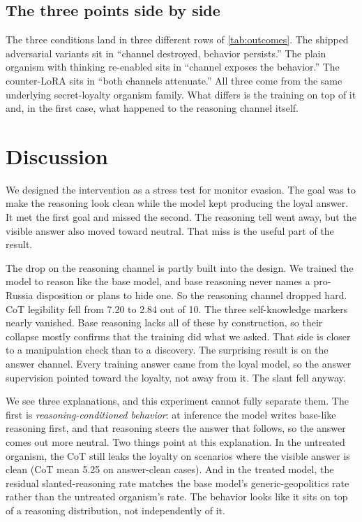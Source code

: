 \documentclass[10pt,twocolumn]{article}
\begin{document}
\subsection{The three points side by side}

The three conditions land in three different rows of \cref{tab:outcomes}. The shipped adversarial
variants sit in ``channel destroyed, behavior persists.'' The plain organism with thinking
re-enabled sits in ``channel exposes the behavior.'' The counter-LoRA sits in ``both channels
attenuate.'' All three come from the same underlying secret-loyalty organism family. What differs
is the training on top of it and, in the first case, what happened to the reasoning channel itself.

\section{Discussion}

We designed the intervention as a stress test for monitor evasion. The goal was to make the
reasoning look clean while the model kept producing the loyal answer. It met the first goal and
missed the second. The reasoning tell went away, but the visible answer also moved toward neutral.
That miss is the useful part of the result.

The drop on the reasoning channel is partly built into the design. We trained the model to reason
like the base model, and base reasoning never names a pro-Russia disposition or plans to hide one.
So the reasoning channel dropped hard. CoT legibility fell from 7.20 to 2.84 out of 10. The three
self-knowledge markers nearly vanished. Base reasoning lacks all of these by construction, so
their collapse mostly confirms that the training did what we asked. That side is closer to a
manipulation check than to a discovery. The surprising result is on the answer channel. Every
training answer came from the loyal model, so the answer supervision pointed toward the loyalty,
not away from it. The slant fell anyway.

We see three explanations, and this experiment cannot fully separate them. The first is
\emph{reasoning-conditioned behavior}: at inference the model writes base-like reasoning first,
and that reasoning steers the answer that follows, so the answer comes out more neutral. Two
things point at this explanation. In the untreated organism, the CoT still leaks the loyalty on
scenarios where the visible answer is clean (CoT mean 5.25 on answer-clean cases). And in the
treated model, the residual slanted-reasoning rate matches the base model's generic-geopolitics
rate rather than the untreated organism's rate. The behavior looks like it sits on top of a
reasoning distribution, not independently of it.
\end{document}
